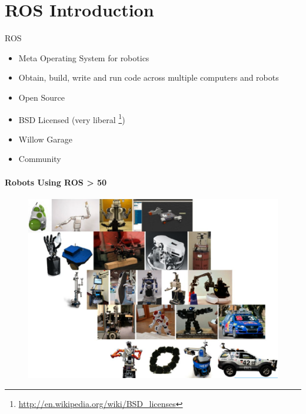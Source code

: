 
\lyxframeend{}\section{ROS Introduction}


\lyxframeend{}

ROS
\begin{itemize}
\item Meta Operating System for robotics
\item Obtain, build, write and run code across multiple computers and robots
\item Open Source
\item BSD Licensed (very liberal%
\footnote{\href{http://en.wikipedia.org/wiki/BSD_licenses}{http://en.wikipedia.org/wiki/BSD\_{}licenses}%
})
\item Willow Garage
\item Community
\end{itemize}

\lyxframeend{}


\lyxframeend{}


\framesubtitle{Robots Using ROS > 50}

\noindent \begin{center}
\begin{figure}[H]
\noindent \centering{}\includegraphics[bb=0bp -160bp 952bp 480bp,height=0.8\paperheight]{images/ROSManyRobots}
\end{figure}

\par\end{center}


